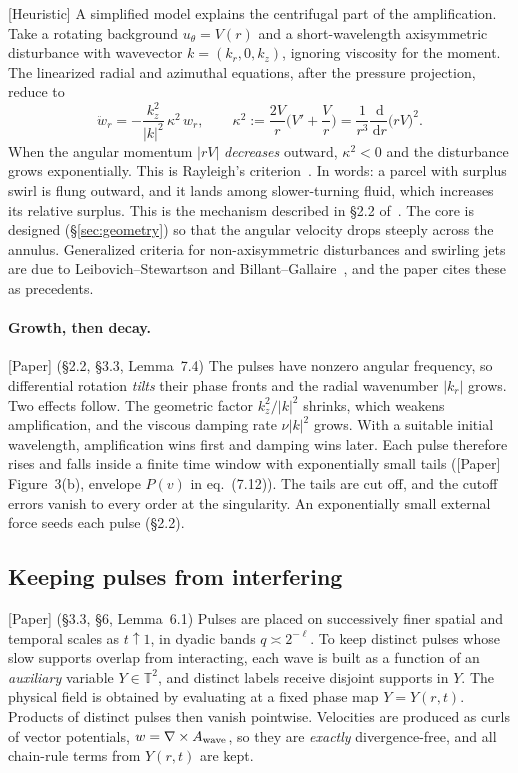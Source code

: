 \documentclass[11pt]{article}
\newcommand{\T}{\mathbb{T}}
\newcommand{\dd}{\,\mathrm{d}}
\theoremstyle{plain}
\theoremstyle{remark}
\newcommand{\paper}{\textsf{\small[Paper]}}
\newcommand{\heur}{\textsf{\small[Heuristic]}}
\begin{document}
\heur{} A simplified model explains the centrifugal part of the amplification. Take a rotating background $u_\theta=V(r)$ and a short-wavelength axisymmetric disturbance with wavevector $k=(k_r,0,k_z)$, ignoring viscosity for the moment. The linearized radial and azimuthal equations, after the pressure projection, reduce to
\[
\ddot w_r=-\frac{k_z^2}{|k|^2}\,\kappa^2\,w_r,\qquad \kappa^2:=\frac{2V}{r}\Big(V'+\frac Vr\Big)=\frac1{r^3}\frac{\dd}{\dd r}\big(rV\big)^2 .
\]
When the angular momentum $|rV|$ \emph{decreases} outward, $\kappa^2<0$ and the disturbance grows exponentially. This is Rayleigh's criterion~\cite{Ray}. In words: a parcel with surplus swirl is flung outward, and it lands among slower-turning fluid, which increases its relative surplus. This is the mechanism described in \S2.2 of~\cite{OAI}. The core is designed (\S\ref{sec:geometry}) so that the angular velocity drops steeply across the annulus. Generalized criteria for non-axisymmetric disturbances and swirling jets are due to Leibovich--Stewartson and Billant--Gallaire~\cite{LS,BG05,BG13}, and the paper cites these as precedents.

\paragraph{Growth, then decay.} \paper{} (\S2.2, \S3.3, Lemma~7.4) The pulses have nonzero angular frequency, so differential rotation \emph{tilts} their phase fronts and the radial wavenumber $|k_r|$ grows. Two effects follow. The geometric factor $k_z^2/|k|^2$ shrinks, which weakens amplification, and the viscous damping rate $\nu|k|^2$ grows. With a suitable initial wavelength, amplification wins first and damping wins later. Each pulse therefore rises and falls inside a finite time window with exponentially small tails (\paper{} Figure~3(b), envelope $P(v)$ in eq.~(7.12)). The tails are cut off, and the cutoff errors vanish to every order at the singularity. An exponentially small external force seeds each pulse (\S2.2).

\subsection{Keeping pulses from interfering}
\paper{} (\S3.3, \S6, Lemma~6.1) Pulses are placed on successively finer spatial and temporal scales as $t\uparrow1$, in dyadic bands $q\asymp2^{-\ell}$. To keep distinct pulses whose slow supports overlap from interacting, each wave is built as a function of an \emph{auxiliary} variable $Y\in\T^2$, and distinct labels receive disjoint supports in $Y$. The physical field is obtained by evaluating at a fixed phase map $Y=Y(r,t)$. Products of distinct pulses then vanish pointwise. Velocities are produced as curls of vector potentials, $w=\nabla\times A_{\rm wave}$, so they are \emph{exactly} divergence-free, and all chain-rule terms from $Y(r,t)$ are kept.
\end{document}
